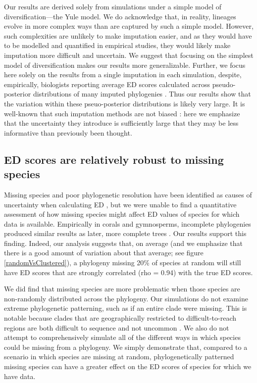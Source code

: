 \documentclass[10pt,english]{article}
\begin{document}
Our results are derived solely from simulations under a simple model of
diversification---the Yule model. We do acknowledge that, in reality, lineages
evolve in more complex ways than are captured by such a simple model. However,
such complexities are unlikely to make imputation easier, and as they would have
to be modelled and quantified in empirical studies, they would likely make
imputation more difficult and uncertain. We suggest that focusing on the
simplest model of diversification makes our results more generalizable. Further,
we focus here solely on the results from a single imputation in each simulation,
despite, empirically, biologists reporting average ED scores calculated across
pseudo-posterior distributions of many imputed phylogenies \autocite{Kuhn2011}.
Thus our results show that the variation within these pseuo-posterior
distributions is likely very large. It is well-known that such imputation
methods are not biased \autocite[indeed, this was originally shown
by][]{Kuhn2011}: here we emphasize that the uncertainty they introduce is
sufficiently large that they may be less informative than previously been
thought.

\subsection*{ED scores are relatively robust to missing species}
Missing species and poor phylogenetic resolution have been identified as causes
of uncertainty when calculating ED \autocite{Isaac2007}, but we were unable to
find a quantitative assessment of how missing species might affect ED values of
species for which data is available. Empirically in corals and gymnosperms,
incomplete phylogenies produced similar results as later, more complete trees
\autocite{Curnick2015, Forest2018}. Our results support this finding. Indeed,
our analysis suggests that, on average (and we emphasize that there is a good
amount of variation about that average; see figure \ref{randomVsClustered}), a
phylogeny missing 20\% of species at random will still have ED scores that are
strongly correlated (rho = 0.94) with the true ED scores.

We did find that missing species are more problematic when those species are
non-randomly distributed across the phylogeny. Our simulations do not examine
extreme phylogenetic patterning, such as if an entire clade were missing. This
is notable because clades that are geographically restricted to
difficult-to-reach regions are both difficult to sequence and not uncommon
\autocite[as is seen with 27 coral species in the Indian
Ocean;][]{Arrigoni2012}. We also do not attempt to comprehensively simulate all
of the different ways in which species could be missing from a phylogeny. We
simply demonstrate that, compared to a scenario in which species are missing at
random, phylogenetically patterned missing species can have a greater effect on
the ED scores of species for which we have data.
\end{document}
